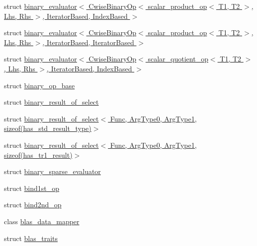 \begin{DoxyCompactItemize}
\item 
struct \hyperlink{struct_eigen_1_1internal_1_1binary__evaluator_3_01_cwise_binary_op_3_01scalar__product__op_3_01_f2d05246f46046f640624904370b9473}{binary\+\_\+evaluator$<$ Cwise\+Binary\+Op$<$ scalar\+\_\+product\+\_\+op$<$ T1, T2 $>$, Lhs, Rhs $>$, Iterator\+Based, Index\+Based $>$}
\item 
struct \hyperlink{struct_eigen_1_1internal_1_1binary__evaluator_3_01_cwise_binary_op_3_01scalar__product__op_3_01_c08fe00fb24daf817c472c5c54760eed}{binary\+\_\+evaluator$<$ Cwise\+Binary\+Op$<$ scalar\+\_\+product\+\_\+op$<$ T1, T2 $>$, Lhs, Rhs $>$, Iterator\+Based, Iterator\+Based $>$}
\item 
struct \hyperlink{struct_eigen_1_1internal_1_1binary__evaluator_3_01_cwise_binary_op_3_01scalar__quotient__op_3_0128fd42b06614e5f165ed5bc517363d65}{binary\+\_\+evaluator$<$ Cwise\+Binary\+Op$<$ scalar\+\_\+quotient\+\_\+op$<$ T1, T2 $>$, Lhs, Rhs $>$, Iterator\+Based, Index\+Based $>$}
\item 
struct \hyperlink{struct_eigen_1_1internal_1_1binary__op__base}{binary\+\_\+op\+\_\+base}
\item 
struct \hyperlink{struct_eigen_1_1internal_1_1binary__result__of__select}{binary\+\_\+result\+\_\+of\+\_\+select}
\item 
struct \hyperlink{struct_eigen_1_1internal_1_1binary__result__of__select_3_01_func_00_01_arg_type0_00_01_arg_type12f7b681b9b0e96643c5ba0b38cf06652}{binary\+\_\+result\+\_\+of\+\_\+select$<$ Func, Arg\+Type0, Arg\+Type1, sizeof(has\+\_\+std\+\_\+result\+\_\+type)$>$}
\item 
struct \hyperlink{struct_eigen_1_1internal_1_1binary__result__of__select_3_01_func_00_01_arg_type0_00_01_arg_type19eb2d03c93e1465fabde3b560e3be1a4}{binary\+\_\+result\+\_\+of\+\_\+select$<$ Func, Arg\+Type0, Arg\+Type1, sizeof(has\+\_\+tr1\+\_\+result)$>$}
\item 
struct \hyperlink{struct_eigen_1_1internal_1_1binary__sparse__evaluator}{binary\+\_\+sparse\+\_\+evaluator}
\item 
struct \hyperlink{struct_eigen_1_1internal_1_1bind1st__op}{bind1st\+\_\+op}
\item 
struct \hyperlink{struct_eigen_1_1internal_1_1bind2nd__op}{bind2nd\+\_\+op}
\item 
class \hyperlink{class_eigen_1_1internal_1_1blas__data__mapper}{blas\+\_\+data\+\_\+mapper}
\item 
struct \hyperlink{struct_eigen_1_1internal_1_1blas__traits}{blas\+\_\+traits}
\item 

\end{DoxyCompactItemize}
